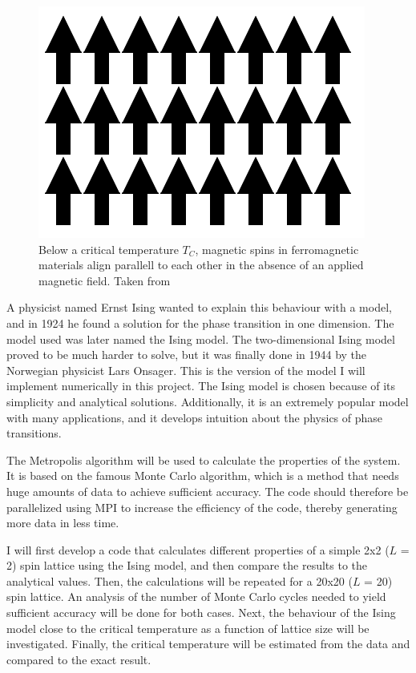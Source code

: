 \documentclass[10pt,a4paper,titlepage]{article}
\begin{document}
\begin{figure}[ht!]
\centering
\centering\includegraphics[scale=0.4]{spin_align.png}
\caption{Below a critical temperature $T_C$, magnetic spins in ferromagnetic materials align parallell to each other in the absence of an applied magnetic field. Taken from \cite{spin_align} \label{fig:spin_align}}
\end{figure}

A physicist named Ernst Ising wanted to explain this behaviour with a model, and in 1924 he found a solution for the phase transition in one dimension. The model used was later named the Ising model. The two-dimensional Ising model proved to be much harder to solve, but it was finally done in 1944 by the Norwegian physicist Lars Onsager. This is the version of the model I will implement numerically in this project. The Ising model is chosen because of its simplicity and analytical solutions. Additionally, it is an extremely popular  model with many applications, and it develops intuition about the physics of phase transitions.

The Metropolis algorithm will be used to calculate the properties of the system. It is based on the famous Monte Carlo algorithm, which is a method that needs huge amounts of data to achieve sufficient accuracy. The code should therefore be parallelized using MPI to increase the efficiency of the code, thereby generating more data in less time.  

I will first develop a code that calculates different properties of a simple 2x2 ($L$ = 2) spin lattice using the Ising model, and then compare the results to the analytical values.  Then, the calculations will be repeated for a 20x20 ($L$ = 20) spin lattice. An analysis of the number of Monte Carlo cycles needed to yield sufficient accuracy will be done for both cases. Next, the behaviour of the Ising model close to the critical temperature as a function of lattice size will be investigated. Finally, the critical temperature will be estimated from the data and compared to the exact result.
\end{document}
